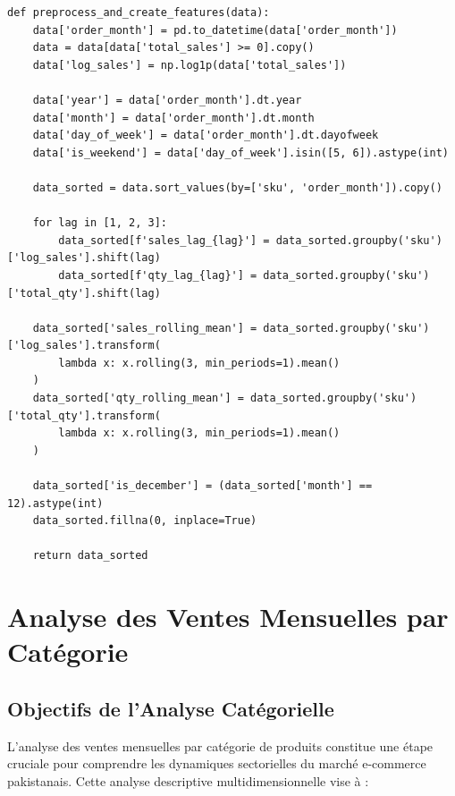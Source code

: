 \documentclass[a4paper,12pt]{article}
\begin{document}
\begin{lstlisting}[style=pythonstyle, caption={Création des lag features et variables saisonnières}, label={lst:feature_engineering}]
def preprocess_and_create_features(data):
    data['order_month'] = pd.to_datetime(data['order_month'])
    data = data[data['total_sales'] >= 0].copy()
    data['log_sales'] = np.log1p(data['total_sales'])
    
    data['year'] = data['order_month'].dt.year
    data['month'] = data['order_month'].dt.month
    data['day_of_week'] = data['order_month'].dt.dayofweek
    data['is_weekend'] = data['day_of_week'].isin([5, 6]).astype(int)
    
    data_sorted = data.sort_values(by=['sku', 'order_month']).copy()
    
    for lag in [1, 2, 3]:
        data_sorted[f'sales_lag_{lag}'] = data_sorted.groupby('sku')['log_sales'].shift(lag)
        data_sorted[f'qty_lag_{lag}'] = data_sorted.groupby('sku')['total_qty'].shift(lag)
    
    data_sorted['sales_rolling_mean'] = data_sorted.groupby('sku')['log_sales'].transform(
        lambda x: x.rolling(3, min_periods=1).mean()
    )
    data_sorted['qty_rolling_mean'] = data_sorted.groupby('sku')['total_qty'].transform(
        lambda x: x.rolling(3, min_periods=1).mean()
    )
    
    data_sorted['is_december'] = (data_sorted['month'] == 12).astype(int)
    data_sorted.fillna(0, inplace=True)

    return data_sorted
\end{lstlisting}

\section{Analyse des Ventes Mensuelles par Catégorie}
\label{sec:ventes_categorie}

\subsection{Objectifs de l'Analyse Catégorielle}

L'analyse des ventes mensuelles par catégorie de produits constitue une étape cruciale pour comprendre les dynamiques sectorielles du marché e-commerce pakistanais. Cette analyse descriptive multidimensionnelle vise à :
\end{document}
